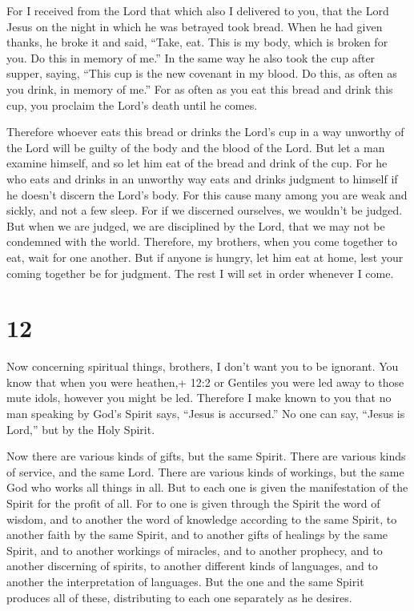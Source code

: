  For I received from the Lord that which also I delivered
to you, that the Lord Jesus on the night in which he was betrayed took
bread.  When he had given thanks, he broke it and said,
``Take, eat. This is my body, which is broken for you. Do this in memory
of me.''  In the same way he also took the cup after
supper, saying, ``This cup is the new covenant in my blood. Do this, as
often as you drink, in memory of me.''  For as often as you
eat this bread and drink this cup, you proclaim the Lord's death until
he comes.

 Therefore whoever eats this bread or drinks the Lord's cup
in a way unworthy of the Lord will be guilty of the body and the blood
of the Lord.  But let a man examine himself, and so let him
eat of the bread and drink of the cup.  For he who eats and
drinks in an unworthy way eats and drinks judgment to himself if he
doesn't discern the Lord's body.  For this cause many among
you are weak and sickly, and not a few sleep.  For if we
discerned ourselves, we wouldn't be judged.  But when we
are judged, we are disciplined by the Lord, that we may not be condemned
with the world.  Therefore, my brothers, when you come
together to eat, wait for one another.  But if anyone is
hungry, let him eat at home, lest your coming together be for judgment.
The rest I will set in order whenever I come.

\hypertarget{section-11}{%
\section{12}\label{section-11}}

 Now concerning spiritual things, brothers, I don't want you
to be ignorant.  You know that when you were heathen,+ 12:2
or Gentiles you were led away to those mute idols, however you might be
led.  Therefore I make known to you that no man speaking by
God's Spirit says, ``Jesus is accursed.'' No one can say, ``Jesus is
Lord,'' but by the Holy Spirit.

 Now there are various kinds of gifts, but the same Spirit.
 There are various kinds of service, and the same Lord.
 There are various kinds of workings, but the same God who
works all things in all.  But to each one is given the
manifestation of the Spirit for the profit of all.  For to
one is given through the Spirit the word of wisdom, and to another the
word of knowledge according to the same Spirit,  to another
faith by the same Spirit, and to another gifts of healings by the same
Spirit,  and to another workings of miracles, and to
another prophecy, and to another discerning of spirits, to another
different kinds of languages, and to another the interpretation of
languages.  But the one and the same Spirit produces all of
these, distributing to each one separately as he desires.

